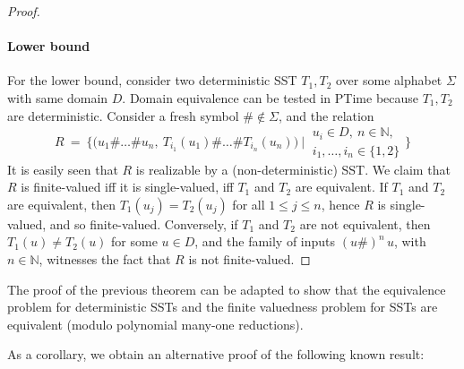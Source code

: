 \documentclass{article}
\newcommand{\RestateGo}[1]{\renewcommand{#1}{(Restated)}}
\newcommand{\alp}{\Sigma}
\begin{document}
\begin{proof}
    
    \paragraph{Lower bound} For the lower bound, consider two deterministic SST $T_1,T_2$ over
    some alphabet $\alp$ with same domain $D$. Domain equivalence can be
    tested in {\upshape\sc PTime} because $T_1,T_2$ are deterministic. 
    Consider a fresh symbol $\#\not\in\Sigma$,
    and the relation
    \[
    R ~=~ \Big\{ \big(u_1 \# \dots \# u_n, \: T_{i_1}(u_1) \# \dots \# T_{i_n}(u_n)\big) 
                 ~\Big|~
                 \begin{smallmatrix}
                 u_i\in D, ~
                 n\in\mathbb{N}, \\
                 i_1,\dots,i_n\in\{1,2\} 
                 \end{smallmatrix} 
          \Big\}
    \]
    It is easily seen that $R$ is realizable 
    by a (non-deterministic) SST. 
    We claim that $R$ is finite-valued iff it is single-valued, iff
    $T_1$ and $T_2$ are equivalent. 
    If $T_1$ and $T_2$ are equivalent,
    then $T_1(u_j) = T_2(u_j)$ for all $1\leq j\leq n$, hence $R$ is
    single-valued, and so finite-valued. 
    Conversely, if $T_1$ and $T_2$ are not equivalent, then 
    $T_1(u)\neq T_2(u)$ for some $u\in D$, and the family of inputs 
    $(u\#)^n \, u$, with $n\in\mathbb{N}$, witnesses the fact that
    $R$ is not finite-valued. 
\end{proof}

\begin{remark}
    The proof of the previous theorem can be adapted to show that the equivalence problem for deterministic SSTs and the finite valuedness problem for SSTs are equivalent (modulo polynomial many-one reductions).
\end{remark}

As a corollary, we obtain an alternative proof of the following 
known result:

\RestateGo{\restateYen}
\Yen*
\end{document}
